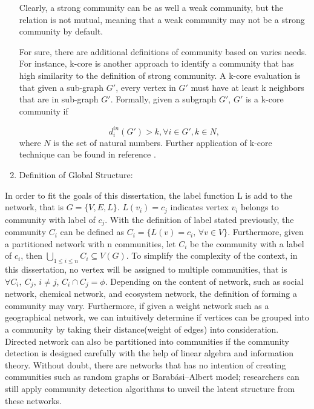 \documentclass[12pt]{article}
\begin{document}
\begin{enumerate}[label=(\roman*)]
Clearly, a strong community can be as well a weak community, but the relation is not mutual, meaning that a weak community may not be a strong community by default. 

For sure, there are additional definitions of community based on varies needs. For instance, k-core is another approach to identify a community that has high similarity to the definition of strong community. A k-core evaluation is that given a sub-graph $G'$, every vertex in $G'$ must have at least k neighbors that are in sub-graph $G'$. Formally, given a subgraph $G'$, $G'$ is a k-core community if 

\begin{equation}\label{eq:k_core}
d_i^{in}(G') > k, \forall i \in G', k \in N,
\end{equation}
where $N$ is the set of natural numbers. Further application of k-core technique can be found in reference \cite{20}.

\item Definition of Global Structure:
\end{enumerate}

In order to fit the goals of this dissertation, the label function L is add to the network, that is $G = \{V,E,L\}$. $L(v_i) = c_j$ indicates vertex $v_i$ belongs to community with label of $c_j$. With the definition of label stated previously, the community $C_i$ can be defined as $C_i = \{ L(v) = c_i \text{, } \forall v \in V \}$. Furthermore, given a partitioned network with n communities, let $C_i$ be the community with a label of $c_i$, then $\bigcup_{1 \leq i \leq n} C_i \subseteq V(G)$.  To simplify the complexity of the context, in this dissertation, no vertex will be assigned to multiple communities, that is $\forall C_i,\ C_j \text{, } i \neq j$, $C_i \cap C_j = \phi$. Depending on the content of network, such as social network, chemical network, and ecosystem network, the definition of forming a community may vary. Furthermore, if given a weight network such as a geographical network, we can intuitively determine if vertices can be grouped into a community by taking their distance(weight of edges) into consideration. Directed network can also be partitioned into communities if the community detection is designed carefully with the help of linear algebra and information theory\cite{4}. Without doubt, there are networks that has no intention of creating communities such as random graphs or Barabási–Albert model\cite{5}; researchers can still apply community detection algorithms to unveil the latent structure from these networks.
\end{document}
